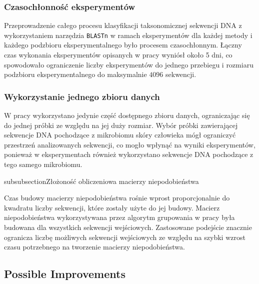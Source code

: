 \documentclass{article}
\newcommand{\temporary}[1]{
    \begin{tcolorbox}[colframe=red, colback=white, title={\textbf{WERSJA PO POLSKU}}, sharp corners=south]
        #1
    \end{tcolorbox}
}
\begin{document}
            \temporary{
                \subsubsection{Czasochłonność eksperymentów}

            Przeprowadzenie całego procesu klasyfikacji taksonomicznej sekwencji DNA z wykorzystaniem narzędzia \texttt{BLASTn} w ramach eksperymentów dla każdej metody i każdego podzbioru eksperymentalnego było procesem czasochłonnym. Łączny czas wykonania eksperymentów opisanych w pracy wyniósł około 5 dni, co spowodowało ograniczenie liczby eksperymentów do jednego przebiegu i rozmiaru podzbioru eksperymentalnego do maksymalnie $4096$ sekwencji.

        \subsubsection{Wykorzystanie jednego zbioru danych}

            W pracy wykorzystano jedynie część dostępnego zbioru danych, ograniczając się do jednej próbki ze względu na jej duży rozmiar. Wybór próbki zawierającej sekwencje DNA pochodzące z mikrobiomu skóry człowieka mógł ograniczyć przestrzeń analizowanych sekwencji, co mogło wpłynąć na wyniki eksperymentów, ponieważ w eksperymentach również wykorzystano sekwencje DNA pochodzące z tego samego mikrobiomu.
            
            subsubsection{Złożoność obliczeniowa macierzy niepodobieństwa}

            Czas budowy macierzy niepodobieństwa rośnie wprost proporcjonalnie do kwadratu liczby sekwencji, które zostały użyte do jej budowy. Macierz niepodobieństwa wykorzystywana przez algorytm grupowania w pracy była budowana dla wszystkich sekwencji wejściowych. Zastosowane podejście znacznie ogranicza liczbę możliwych sekwencji wejściowych ze względu na szybki wzrost czasu potrzebnego na tworzenie macierzy niepodobieństwa.
            }

        \subsection{Possible Improvements}
\end{document}
